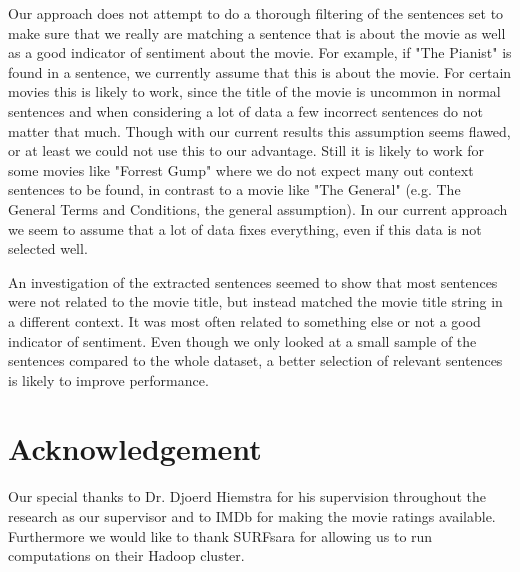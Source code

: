 \documentclass{sig-alternate-br}
\begin{document}
Our approach does not attempt to do a thorough filtering of the sentences set to make sure that we really are matching a sentence that is about the movie as well as a good indicator of sentiment about the movie. For example, if "The Pianist" is found in a sentence, we currently assume that this is about the movie. For certain movies this is likely to work, since the title of the movie is uncommon in normal sentences and when considering a lot of data a few incorrect sentences do not matter that much. Though with our current results this assumption seems flawed, or at least we could not use this to our advantage. Still it is likely to work for some movies like "Forrest Gump" where we do not expect many out context sentences to be found, in contrast to a movie like "The General" (e.g. The General Terms and Conditions, the general assumption). In our current approach we seem to assume that a lot of data fixes everything, even if this data is not selected well.

An investigation of the extracted sentences seemed to show that most sentences were not related to the movie title, but instead matched the movie title string in a different context. It was most often related to something else or not a good indicator of sentiment. Even though we only looked at a small sample of the sentences compared to the whole dataset, a better selection of relevant sentences is likely to improve performance.

\section{Acknowledgement}
Our special thanks to Dr. Djoerd Hiemstra for his supervision throughout the research as our supervisor and to IMDb for making the movie ratings available. Furthermore we would like to thank SURFsara for allowing us to run computations on their Hadoop cluster.
%




\balancecolumns

\onecolumn
\end{document}

